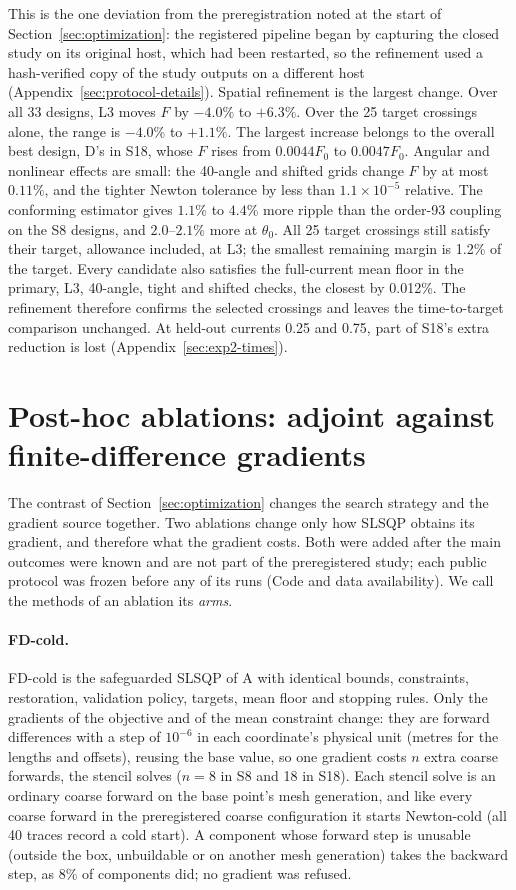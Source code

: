 This is the one deviation from the preregistration noted at the start of
Section~\ref{sec:optimization}: the registered pipeline began by capturing
the closed study on its original host, which had been restarted, so the
refinement used a hash-verified copy of the study outputs on a different
host (Appendix~\ref{sec:protocol-details}). Spatial refinement is the largest change. Over all 33 designs, L3 moves
$F$ by $-4.0\%$ to $+6.3\%$. Over the 25 target crossings alone, the range
is $-4.0\%$ to $+1.1\%$. The largest increase belongs to the overall best
design, D's in S18, whose $F$ rises from $0.0044F_0$ to $0.0047F_0$.
Angular and nonlinear effects are small: the 40-angle and shifted grids
change $F$ by at most $0.11\%$, and the tighter Newton tolerance by less
than $1.1\times10^{-5}$ relative. The conforming estimator gives $1.1\%$ to
$4.4\%$ more ripple than the order-93 coupling on the S8 designs, and
$2.0$--$2.1\%$ more at $\theta_0$. All 25 target crossings still satisfy
their target, allowance included, at L3; the smallest remaining margin is
1.2\% of the target. Every candidate also satisfies the full-current mean
floor in the primary, L3, 40-angle, tight and shifted checks, the closest
by 0.012\%. The refinement therefore confirms the selected crossings and
leaves the time-to-target comparison unchanged. At held-out currents
0.25 and 0.75, part of S18's extra reduction is lost
(Appendix~\ref{sec:exp2-times}).

\section{Post-hoc ablations: adjoint against finite-difference gradients}\label{sec:exp2-fd}
The contrast of Section~\ref{sec:optimization} changes the search strategy
and the gradient source together. Two ablations change only how SLSQP
obtains its gradient, and therefore what the gradient costs. Both were
added after the main outcomes were known and are not part of the
preregistered study; each public protocol was frozen before any of its
runs (Code and data availability). We call the methods of an ablation its
\emph{arms}.

\paragraph{FD-cold.}
FD-cold is the safeguarded SLSQP of A with identical bounds, constraints,
restoration, validation policy, targets, mean floor and stopping rules.
Only the gradients of the objective and of the mean constraint change: they
are forward differences with a step of $10^{-6}$ in each coordinate's
physical unit (metres for the lengths and offsets), reusing the base value,
so one gradient costs $n$ extra coarse forwards, the stencil solves
($n=8$ in S8 and 18 in S18). Each stencil solve is an ordinary coarse
forward on the base point's mesh generation, and like every coarse
forward in the preregistered coarse configuration it starts Newton-cold
(all 40 traces record a cold start). A component whose forward step is
unusable (outside the box, unbuildable or on another mesh generation) takes
the backward step, as 8\% of components did; no gradient was refused.

